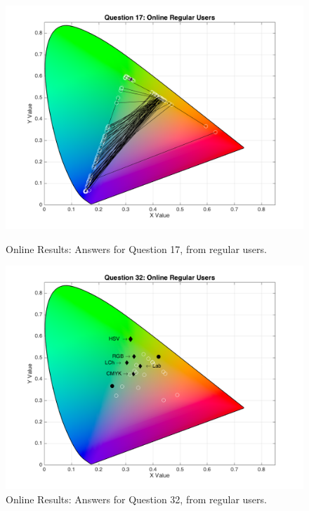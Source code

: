 \begin{figure}[!htbp]
  \centering
  \begin{minipage}{0.48\textwidth}
    \centering
    \includegraphics[width=\textwidth]{images/results/17_online_regularUsers.png}
    \caption[Online Results: Answers for Question 17, from regular users.]{Online Results: Answers for Question 17, from regular users.}
    \label{fig:greenblend_1}
  \end{minipage}\hfill
  \begin{minipage}{0.48\textwidth}
    \centering
    \includegraphics[width=\textwidth]{images/results/32_online_regularUsers.png}
    \caption[Online Results: Answers for Question 32, from regular users.]{Online Results: Answers for Question 32, from regular users.}
    \label{fig:greenblend_2}
  \end{minipage}
\end{figure}
%

